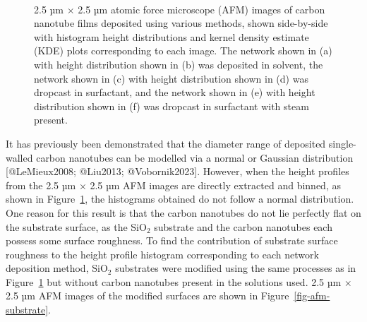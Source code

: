 \documentclass[
  letterpaper,
  DIV=11,
  numbers=noendperiod]{scrartcl}
\begin{document}
\begin{figure}
\begin{minipage}[t]{0.45\linewidth}
{{}

}

\end{minipage}%
%
\begin{minipage}[t]{0.01\linewidth}

{\centering 

~

}

\end{minipage}%

\caption{\label{fig-afm-morphology}2.5 µm \(\times\) 2.5 µm atomic force
microscope (AFM) images of carbon nanotube films deposited using various
methods, shown side-by-side with histogram height distributions and
kernel density estimate (KDE) plots corresponding to each image. The
network shown in (a) with height distribution shown in (b) was deposited
in solvent, the network shown in (c) with height distribution shown in
(d) was dropcast in surfactant, and the network shown in (e) with height
distribution shown in (f) was dropcast in surfactant with steam
present.}

\end{figure}

It has previously been demonstrated that the diameter range of deposited
single-walled carbon nanotubes can be modelled via a normal or Gaussian
distribution {[}@LeMieux2008; @Liu2013; @Vobornik2023{]}. However, when
the height profiles from the 2.5 µm \(\times\) 2.5 µm AFM images are
directly extracted and binned, as shown in
Figure~\ref{fig-afm-morphology}, the histograms obtained do not follow a
normal distribution. One reason for this result is that the carbon
nanotubes do not lie perfectly flat on the substrate surface, as the
SiO\(_2\) substrate and the carbon nanotubes each possess some surface
roughness. To find the contribution of substrate surface roughness to
the height profile histogram corresponding to each network deposition
method, SiO\(_2\) substrates were modified using the same processes as
in Figure~\ref{fig-afm-morphology} but without carbon nanotubes present
in the solutions used. 2.5 µm \(\times\) 2.5 µm AFM images of the
modified surfaces are shown in Figure~\ref{fig-afm-substrate}.
\end{document}
